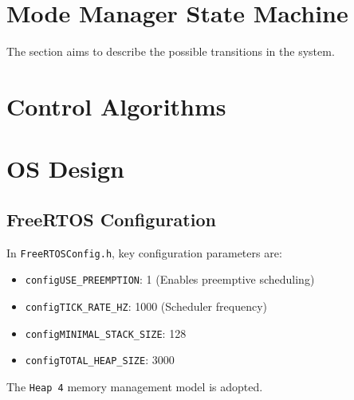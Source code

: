 \section{Mode Manager State Machine}
The section aims to describe the possible transitions in the system. 

\section{Control Algorithms}

\section{OS Design}
\subsection{FreeRTOS Configuration}
In \texttt{FreeRTOSConfig.h}, key configuration parameters are: 
\begin{itemize}
    \item \texttt{configUSE\_PREEMPTION}: 1 (Enables preemptive scheduling)
    \item \texttt{configTICK\_RATE\_HZ}: 1000 (Scheduler frequency)
    \item \texttt{configMINIMAL\_STACK\_SIZE}: 128
    \item \texttt{configTOTAL\_HEAP\_SIZE}: 3000
\end{itemize}
The \texttt{Heap 4} memory management model is adopted. 